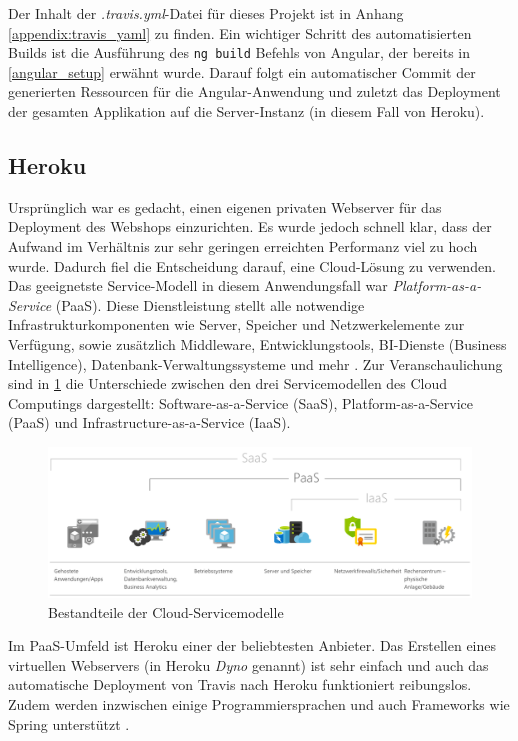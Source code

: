 Der Inhalt der \textit{.travis.yml}-Datei für dieses Projekt ist in Anhang \ref{appendix:travis_yaml} zu finden. Ein wichtiger Schritt des automatisierten Builds ist die Ausführung des \texttt{ng build} Befehls von Angular, der bereits in \cref{angular_setup} erwähnt wurde. Darauf folgt ein automatischer Commit der generierten Ressourcen für die Angular-Anwendung und zuletzt das Deployment der gesamten Applikation auf die Server-Instanz (in diesem Fall von Heroku).

\subsection{Heroku}
Ursprünglich war es gedacht, einen eigenen privaten Webserver für das Deployment des Webshops einzurichten. Es wurde jedoch schnell klar, dass der Aufwand im Verhältnis zur sehr geringen erreichten Performanz viel zu hoch wurde. Dadurch fiel die Entscheidung darauf, eine Cloud-Lösung zu verwenden. Das geeignetste Service-Modell in diesem Anwendungsfall war \textit{Platform-as-a-Service} (PaaS). Diese Dienstleistung stellt alle notwendige Infrastrukturkomponenten wie Server, Speicher und Netzwerkelemente zur Verfügung, sowie zusätzlich Middleware, Entwicklungstools, BI-Dienste (Business Intelligence), Datenbank-Verwaltungssysteme und mehr \cite{Azure2017}. Zur Veranschaulichung sind in \cref{fig:cloud} die Unterschiede zwischen den drei Servicemodellen des Cloud Computings dargestellt: Software-as-a-Service (SaaS), Platform-as-a-Service (PaaS) und Infrastructure-as-a-Service (IaaS).

\begin{figure}[th!]
	\centering
	\includegraphics[width=\linewidth]{bilder/kap8/cloud}
	\caption[Bestandteile der Cloud-Servicemodelle]{Bestandteile der Cloud-Servicemodelle \cite{Azure2017}}
	\label{fig:cloud}
\end{figure}

Im PaaS-Umfeld ist Heroku einer der beliebtesten Anbieter. Das Erstellen eines virtuellen Webservers (in Heroku \textit{Dyno} genannt) ist sehr einfach und auch das automatische Deployment von Travis nach Heroku funktioniert reibungslos. Zudem werden inzwischen einige Programmiersprachen und auch Frameworks wie Spring unterstützt \cite{Coutermarsh2014}.

